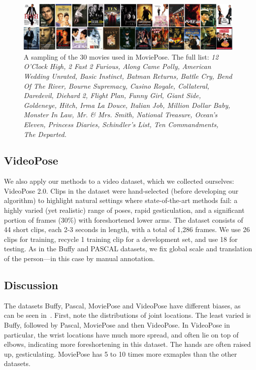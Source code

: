 \begin{figure}[tb]
\begin{center}
\includegraphics[width=1.00\textwidth]{figs/movie-list.png}
\caption[List of MoviePose movies]{A sampling of the 30 movies used in 
MoviePose.  The full list: {\em 12 O'Clock High, 2 Fast 2 Furious, Along Came 
Polly, American Wedding Unrated, Basic Instinct, Batman Returns, Battle Cry, 
Bend Of The River, Bourne Supremacy, Casino Royale, Collateral, Daredevil, 
Diehard 2, Flight Plan, Funny Girl, Giant Side, Goldeneye, Hitch, Irma La 
Douce, Italian Job, Million Dollar Baby, Monster In Law, Mr. \& Mrs.  Smith, 
National Treasure, Ocean's Eleven, Princess Diaries, Schindler's List, Ten 
Commandments, The Departed.}} \label{fig:movielist}
\end{center}
\end{figure}



\subsection{VideoPose}

We also apply our methods to a video dataset, which we collected ourselves: 
VideoPose 2.0.  Clips in the dataset were hand-selected (before developing our 
algorithm) to highlight natural settings where state-of-the-art methods fail: a 
highly varied (yet realistic) range of poses, rapid gesticulation, and a 
significant portion of frames (30\%) with foreshortened lower arms.  The 
dataset consists of 44 short clips, each 2-3 seconds in length, with a total of 
1,286 frames.  We use 26 clips for training, recycle 1 training clip for a 
development set, and use 18 for testing.  As in the Buffy and PASCAL datasets, 
we fix global scale and translation of the person---in this case by manual 
annotation.


\subsection{Discussion}  The datasets Buffy, Pascal, MoviePose and VideoPose 
have different biases, as can be seen in~.  First, 
note the distributions of joint locations.  The least varied is Buffy, followed 
by Pascal, MoviePose and then VideoPose.    In VideoPose in particular, the 
wrist locations have much more spread, and often lie on top of elbows, 
indicating more foreshortening in this dataset.  The hands are often raised up, 
gesticulating.  MoviePose has 5 to 10 times more exmaples than the other 
datasets.

